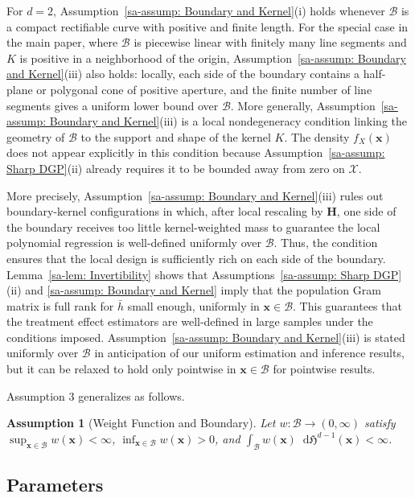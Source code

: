 \documentclass[10pt]{article}
\newtheorem{assumption}{Assumption}
\newcommand{\Haus}{\mathfrak{H}}
\newcommand{\dif}{\mathop{}\!\mathrm{d}}
\newcommand{\bH}{\mathbf{H}}
\newcommand{\bx}{\mathbf{x}}
\newcommand{\B}{\mathcal{B}}
\newcommand{\X}{\mathcal{X}}
\begin{document}
For $d = 2$, Assumption~\ref{sa-assump: Boundary and Kernel}(i) holds whenever $\B$ is a compact rectifiable curve with positive and finite length. For the special case in the main paper, where $\B$ is piecewise linear with finitely many line segments and $K$ is positive in a neighborhood of the origin, Assumption~\ref{sa-assump: Boundary and Kernel}(iii) also holds: locally, each side of the boundary contains a half-plane or polygonal cone of positive aperture, and the finite number of line segments gives a uniform lower bound over $\B$. More generally, Assumption~\ref{sa-assump: Boundary and Kernel}(iii) is a local nondegeneracy condition linking the geometry of $\B$ to the support and shape of the kernel $K$. The density $f_X(\bx)$ does not appear explicitly in this condition because Assumption~\ref{sa-assump: Sharp DGP}(ii) already requires it to be bounded away from zero on $\X$.

More precisely, Assumption~\ref{sa-assump: Boundary and Kernel}(iii) rules out boundary-kernel configurations in which, after local rescaling by $\bH$, one side of the boundary receives too little kernel-weighted mass to guarantee the local polynomial regression is well-defined uniformly over $\B$. Thus, the condition ensures that the local design is sufficiently rich on each side of the boundary. Lemma~\ref{sa-lem: Invertibility} shows that Assumptions~\ref{sa-assump: Sharp DGP}(ii) and \ref{sa-assump: Boundary and Kernel} imply that the population Gram matrix is full rank for $\bar h$ small enough, uniformly in $\bx\in\B$. This guarantees that the treatment effect estimators are well-defined in large samples under the conditions imposed. Assumption~\ref{sa-assump: Boundary and Kernel}(iii) is stated uniformly over $\B$ in anticipation of our uniform estimation and inference results, but it can be relaxed to hold only pointwise in $\bx\in\B$ for pointwise results.

Assumption 3 generalizes as follows.

\begin{assumption}[Weight Function and Boundary]\label{sa-assump: Weight Function and Boundary}
    Let $w:\B \to (0,\infty)$ satisfy $\sup_{\bx\in\B} w(\bx) < \infty$, $\inf_{\bx\in\B} w(\bx) >0$, and $\int_{\B} w(\bx) \dif\Haus^{d-1}(\bx) < \infty$.
\end{assumption}


\subsection{Parameters}
\end{document}
